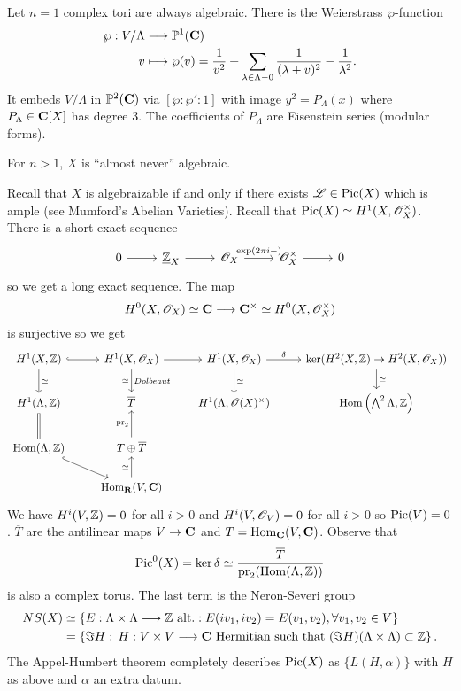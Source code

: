 \begin{example}
Let $n=1$ complex tori are always algebraic. There is the Weierstrass $\wp$-function
\begin{align*}
	\wp: V /\Lambda &\longrightarrow \mathbb{P}^{1}(\mathbf{C}) \\
	v &\longmapsto \wp(v) = \frac{1}{v^2} + \sum_{\lambda\in
	\Lambda-0}\frac{1}{(\lambda+v)^2}-\frac{1}{\lambda^2}
	.
\end{align*}
It embeds $V /\Lambda$ in $\mathbb{P}^2(\mathbf{C})$ via $[\wp:\wp':1]$ with image $y^2=P_\Lambda(x)$
where $P_\Lambda\in \mathbf{C}[X]$ has degree 3. The coefficients of $P_\Lambda$ are Eisenstein
series (modular forms).

For $n>1$, $X$ is ``almost never'' algebraic.
\end{example}
Recall that $X$ is algebraizable if and only if there exists $\mathscr{L}\in \operatorname{Pic}(X)$ which is
ample (see Mumford's Abelian Varieties). Recall that $\operatorname{Pic}(X)\simeq
H^{1}(X,\mathscr{O}_X^{\times})$. There is a short exact sequence
\begin{equation}
\begin{tikzcd}
	0 \ar[r] & \Zc_X \ar[r] & \OO_X \ar[r,"\exp(2\pi i-)"] & \OO_X^{\times} \ar[r] & 0
\end{tikzcd}
\end{equation}
so we get a long exact sequence. The map
\[
H^{0}(X,\OO_X) \isoto \C \to \C^{\times}\isoto H^{0}(X,\OO_X^{\times})
\]
is surjective so we get
\begin{equation}
\begin{tikzcd}
	H^{1}(X,\Z) \ar[r,hook] \ar[d,"\isoto"] & H^{1}(X,\OO_X) \ar[d,"\isoto"',"Dolbeaut"]
	\ar[r] & H^{1}(X,\OO_X) \ar[d,"\isoto"] \ar[r,"\delta"] & \ker (H^2(X,\Z)\to
	H^2(X,\OO_X)) \ar[d,"\isoto"] \\
	H^{1}(\Lambda,\Z) \ar[d,equal] & \overline{T} & H^{1}(\Lambda,\OO(X)^{\times}) &
	\Hom\left( \bigwedge^2\Lambda,\Z \right)  \\
	\Hom(\Lambda,\Z) \ar[dr,hook] & T \oplus \overline{T} \ar[u,"\pr_2"] \\
	& \Hom_{\R}(V,\C) \ar[u,"\isoto"]
\end{tikzcd}
\end{equation}
We have $H^{i}(V,\mathbb Z)=0$ for all $i>0$ and $H^{i}(V,\mathscr{O}_V)=0$ for all $i>0$ so
$\operatorname{Pic}(V)=0$. $\overline{T}$ are the antilinear maps $V\to \C$ and $T=\operatorname{Hom}_{\mathbf{C}}(V,\mathbf{C})$. Observe that
\[
\operatorname{Pic}^{0}(X) = \operatorname{ker}\delta \simeq \frac{\overline{T}}{\operatorname{pr}_2(\operatorname{Hom}(\Lambda,\mathbb Z))}
\]
is also a complex torus. The last term is the Neron-Severi group
\begin{align*}
NS(X) &\isoto \{E:\Lambda\times \Lambda\to \Z\text{ alt.}: E(iv_1,iv_2)=E(v_1,v_2),
\forall v_1,v_2\in V\} \\
&= \left\{ \Im H:\, H:V\times V\to \C\text{ Hermitian such that }(\Im H)(\Lambda\times
\Lambda)\subset \Z \right\}
.
\end{align*}
The Appel-Humbert theorem completely describes $\operatorname{Pic}(X)$ as $\{L(H,\alpha)\} $ with $H$
as above and $\alpha$ an extra datum.

